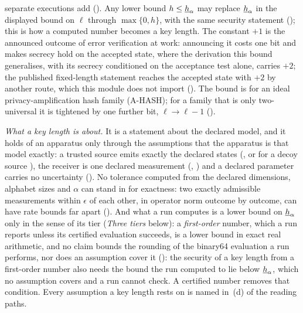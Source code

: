 separate executions add (). Any lower
bound $h\le\underline{h}_{\alpha}$ may replace $\underline{h}_{\alpha}$ in the displayed bound on $\ell$
through $\max\{0,h\}$, with the same security statement (); this is how a
computed number becomes a key length. The constant $+1$ is the announced
outcome of error verification at work: announcing it costs one bit and makes
secrecy hold on the accepted state, where the derivation this bound
generalises, with its secrecy conditioned on the acceptance test alone,
carries $+2$; the published fixed-length statement reaches the accepted
state with $+2$ by another route, which this module does not import
(). The bound is for an ideal
privacy-amplification hash family (A-HASH); for a family that is only
two-universal it is tightened by one further bit, $\ell\to\ell-1$
().

\emph{What a key length is about.} It is a statement about the declared
model, and it holds of an apparatus only through the assumptions that the
apparatus is that model exactly: a trusted source emits exactly the declared
states (, or for a decoy source
), the receiver is one declared measurement
(, ) and a
declared parameter carries no uncertainty (). No
tolerance computed from the declared dimensions, alphabet sizes and $\alpha$
can stand in for exactness: two exactly admissible measurements within
$\epsilon$ of each other, in operator norm outcome by outcome, can have rate
bounds far apart (). And what a run computes is a lower
bound on $\underline{h}_{\alpha}$ only in the sense of its tier (\emph{Three tiers} below): a
\emph{first-order} number, which a run reports unless its certified
evaluation succeeds, is a lower bound in exact real arithmetic, and no claim
bounds the rounding of the binary64 evaluation a run performs, nor does an
assumption cover it (): the
security of a key length from a first-order number also needs the bound the
run computed to lie below $\underline{h}_{\alpha}$, which no assumption covers and a run
cannot check. A certified number removes that condition. Every
assumption a key length rests on is named in~(d) of the reading paths.

